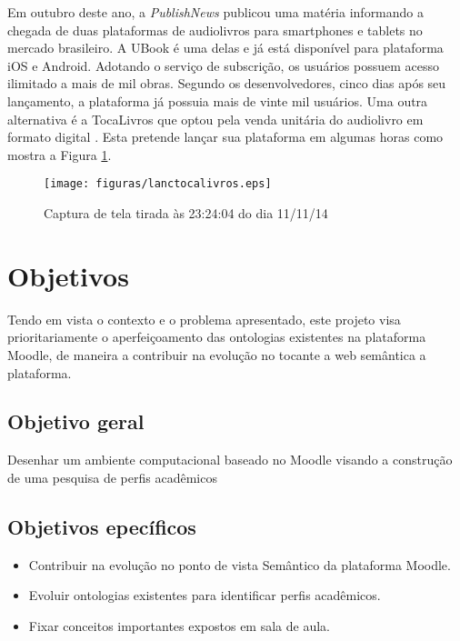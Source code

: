 Em outubro deste ano, a \textit{PublishNews} publicou uma matéria informando a chegada de duas plataformas de audiolivros para smartphones e tablets no mercado brasileiro. A UBook é uma delas e já está disponível para plataforma iOS e Android. Adotando o serviço de subscrição, os usuários possuem acesso ilimitado a mais de mil obras. Segundo os desenvolvedores, cinco dias após seu lançamento, a plataforma já possuia mais de vinte mil usuários. Uma outra alternativa é a TocaLivros que optou pela venda unitária do audiolivro em formato digital \cite{publishnews}. Esta pretende lançar sua plataforma em algumas horas como mostra a Figura \ref{lanctocalivros}.

 \begin{figure}[ht]
	\centering
		\texttt{[image: figuras/lanctocalivros.eps]}
	\caption{Captura de tela tirada às 23:24:04 do dia 11/11/14 \cite{tocalivros}}
	\label{lanctocalivros}
\end{figure}

\section{Objetivos}
Tendo em vista o contexto e o problema apresentado, este projeto visa prioritariamente o aperfeiçoamento das ontologias existentes na plataforma Moodle, de maneira a contribuir na evolução no tocante a web semântica a plataforma.
\subsection{Objetivo geral}
	Desenhar um ambiente computacional baseado no Moodle visando a construção de uma pesquisa de perfis acadêmicos
\subsection{Objetivos epecíficos}
\begin{itemize}
  \item Contribuir na evolução no ponto de vista Semântico da plataforma Moodle.
  \item Evoluir ontologias existentes para identificar perfis acadêmicos.
	\item Fixar conceitos importantes expostos em sala de aula.
\end{itemize}



%
%
%
%
%

